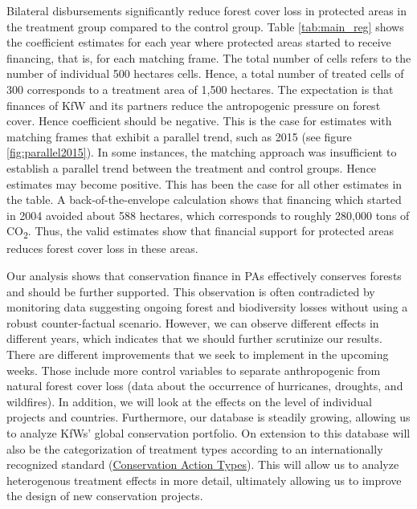 \documentclass{article}
\begin{document}
Bilateral disbursements significantly reduce forest cover loss in protected areas in the treatment group compared to the control group. Table \ref{tab:main_reg} shows the coefficient estimates for each year where protected areas started to receive financing, that is, for each matching frame. The total number of cells refers to the number of individual 500 hectares cells. Hence, a total number of treated cells of 300 corresponds to a treatment area of 1,500 hectares. The expectation is that finances of KfW and its partners reduce the antropogenic pressure on forest cover. Hence coefficient should be negative. This is the case for estimates with matching frames that exhibit a parallel trend, such as 2015 (see figure \ref{fig:parallel2015}). In some instances, the matching approach was insufficient to establish a parallel trend between the treatment and control groups. Hence estimates may become positive. This has been the case for all other estimates in the table. A back-of-the-envelope calculation shows that financing which started in 2004 avoided about 588 hectares, which corresponds to roughly 280,000 tons of CO\textsubscript{2}. Thus, the valid estimates show that financial support for protected areas reduces forest cover loss in these areas.

Our analysis shows that conservation finance in PAs effectively conserves forests and should be further supported. This observation is often contradicted by monitoring data suggesting ongoing forest and biodiversity losses without using a robust counter-factual scenario. However, we can observe different effects in different years, which indicates that we should further scrutinize our results. There are different improvements that we seek to implement in the upcoming weeks. Those include more control variables to separate anthropogenic from natural forest cover loss (data about the occurrence of hurricanes, droughts, and wildfires). In addition, we will look at the effects on the level of individual projects and countries. Furthermore, our database is steadily growing, allowing us to analyze KfWs' global conservation portfolio. On extension to this database will also be the categorization of treatment types according to an internationally recognized standard (\href{https://www.iucnredlist.org/resources/conservation-actions-classification-scheme}{Conservation Action Types}). This will allow us to analyze heterogenous treatment effects in more detail, ultimately allowing us to improve the design of new conservation projects.
\end{document}
